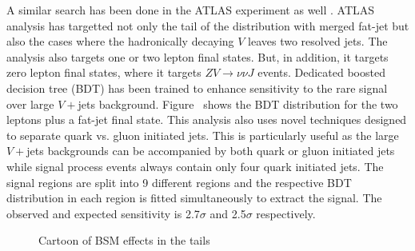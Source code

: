 A similar search has been done in the ATLAS experiment as well \cite{Aad:2019xxo}.
ATLAS analysis has targetted not only the tail of the distribution with merged fat-jet but also the cases where the hadronically decaying $V$ leaves two resolved jets.
The analysis also targets one or two lepton final states. But, in addition, it targets zero lepton final states, where it targets $ZV\to \nu\nu J$ events.
Dedicated boosted decision tree (BDT) has been trained to enhance sensitivity to the rare signal over large $V+$jets background.
Figure~ shows the BDT distribution for the two leptons plus a fat-jet final state.
This analysis also uses novel techniques designed to separate quark vs. gluon initiated jets.
This is particularly useful as the large $V+$jets backgrounds can be accompanied by both quark or gluon initiated jets while signal process events always contain only four quark initiated jets.
The signal regions are split into 9 different regions and the respective BDT distribution in each region is fitted simultaneously to extract the signal.
The observed and expected sensitivity is 2.7$\sigma$ and 2.5$\sigma$ respectively.

\begin{figure}[htb]
\centering
    \quad\quad
\caption{Cartoon of BSM effects in the tails}
\label{fig:BSMTails}
\end{figure}

